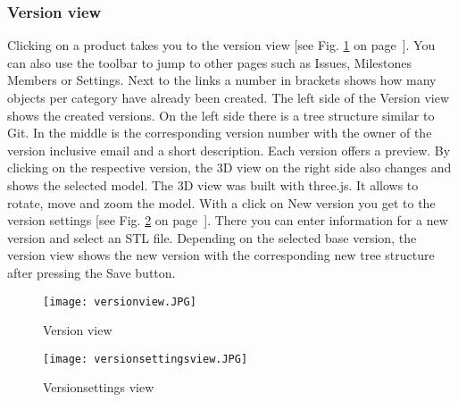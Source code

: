     \subsubsection*{Version view}
    Clicking on a product takes you to the version view [see Fig. \ref{fig: versionview} on page~\pageref{fig: versionview}]. You can also use the toolbar to jump to other pages such as Issues, Milestones Members or Settings. Next to the links a number in brackets shows how many objects per category have already been created. The left side of the Version view shows the created versions. On the left side there is a tree structure similar to Git. In the middle is the corresponding version number with the owner of the version inclusive email and a short description. Each version offers a preview. By clicking on the respective version, the 3D view on the right side also changes and shows the selected model. The 3D view was built with three.js. It allows to rotate, move and zoom the model. With a click on New version you get to the version settings [see Fig. \ref{fig: versionsettingsview} on page~\pageref{fig: versionsettingsview}]. There you can enter information for a new version and select an STL file. Depending on the selected base version, the version view shows the new version with the corresponding new tree structure after pressing the Save button.
    
    \begin{figure}[h]
        \centering
        \texttt{[image: versionview.JPG]}
        \caption{Version view}
        \label{fig: versionview}
    \end{figure}

    \begin{figure}[h]
        \centering
        \texttt{[image: versionsettingsview.JPG]}
        \caption{Versionsettings view}
        \label{fig: versionsettingsview}
    \end{figure}



